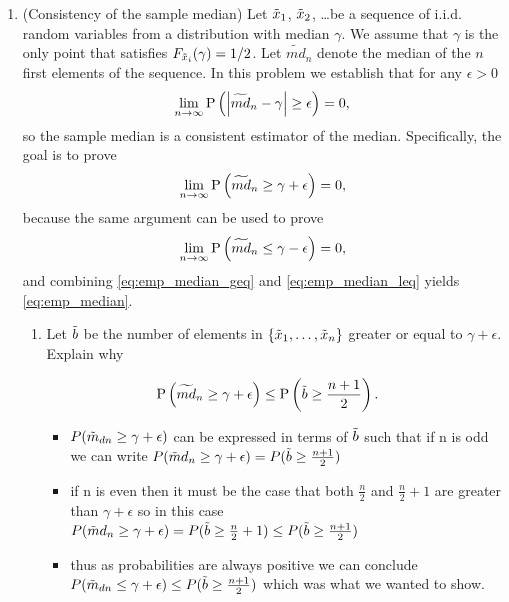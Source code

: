 \documentclass[12pt,twoside]{article}
\begin{document}
\begin{enumerate}
\begin{enumerate}
\end{enumerate}
\newpage
\item (Consistency of the sample median) Let $\tilde{  x }_1$, $\tilde{  x }_2$, \ldots be a sequence of i.i.d. random variables from a distribution with median $\gamma$. We assume that $\gamma$ is the only point that satisfies $F_{\tilde{  x }_i}(\gamma) = 1/2$. Let $\widetilde{md}_n$ denote the median of the $n$ first elements of the sequence. In this problem we establish that for any $\epsilon > 0$
\begin{align}
\label{eq:emp_median}
\lim_{n\rightarrow \infty} \mathrm{P}\left(  \left|  \widetilde{md}_n - \gamma \right| \geq  \epsilon \right) = 0,
\end{align}
so the sample median is a consistent estimator of the median. Specifically, the goal is to prove
\begin{align}
\label{eq:emp_median_geq}
\lim_{n\rightarrow \infty} \mathrm{P}\left(   \widetilde{md}_n  \geq \gamma + \epsilon \right) = 0,
\end{align}
because the same argument can be used to prove
\begin{align}
\label{eq:emp_median_leq}
\lim_{n\rightarrow \infty} \mathrm{P}\left(   \widetilde{md}_n  \leq \gamma - \epsilon \right) = 0,
\end{align}
and combining \eqref{eq:emp_median_geq} and \eqref{eq:emp_median_leq} yields \eqref{eq:emp_median}.
\begin{enumerate}
\item Let $\tilde{ b }$ be the number of elements in $\left\{ \tilde{  x }_1, \ldots, \tilde{  x }_n \right\}$ greater or equal to $\gamma + \epsilon$. Explain why


\begin{align}
\mathrm{P}\left( \widetilde{md}_n \geq \gamma + \epsilon \right) & \leq \mathrm{P} \left(  \tilde{ b } \geq \frac{n+1}{2}  \right). \label{eq:bound_ry_frac}
\end{align}
\begin{itemize}
    \item $P(\Tilde{m}_{dn}\geq  \gamma +\epsilon)$ can be expressed in terms of $\Tilde{b}$ such that if n is odd we can write $P(\Tilde{m}d_{n}\geq \gamma + \epsilon)=P(\Tilde{b}\geq \frac{n+1}{2})$
    \item if n is even then it must be the case that both $\frac{n}{2}$ and $\frac{n}{2}+1$ are greater than $\gamma + \epsilon$ so in this case $P(\Tilde{m}d_{n}\geq \gamma + \epsilon)=P(\Tilde{b}\geq \frac{n}{2}+1)\leq P(\Tilde{b}\geq \frac{n+1}{2})$
    \item thus as probabilities are always positive we can conclude $P(\Tilde{m}_{dn}\leq \gamma +\epsilon)\leq P(\Tilde{b}\geq \frac{n+1}{2})$ which was what we wanted to show. 
\end{itemize}



\end{enumerate}
\end{enumerate}
\end{document}
